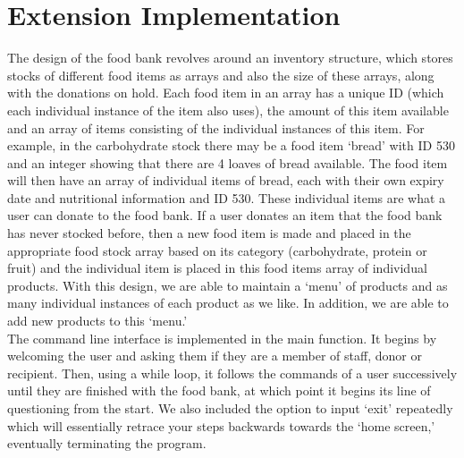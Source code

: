 \documentclass [10pt] {article}
\begin{document}
\section*{Extension Implementation}
The design of the food bank revolves around an inventory structure, which stores stocks of different food items as arrays and also the size of these arrays, along with the donations on hold. Each food item in an array has a unique ID (which each individual instance of the item also uses), the amount of this item available and an array of items consisting of the individual instances of this item. For example, in the carbohydrate stock there may be a food item ‘bread’ with ID 530 and an integer showing that there are 4 loaves of bread available. The food item will then have an array of individual items of bread, each with their own expiry date and nutritional information and ID 530. These individual items are what a user can donate to the food bank. If a user donates an item that the food bank has never stocked before, then a new food item is made and placed in the appropriate food stock array based on its category (carbohydrate, protein or fruit) and the individual item is placed in this food items array of individual products. With this design, we are able to maintain a ‘menu’ of products and as many individual instances of each product as we like. In addition, we are able to add new products to this ‘menu.’ 
\vspace {0.3cm}
\\
The command line interface is implemented in the main function. It begins by welcoming the user and asking them if they are a member of staff, donor or recipient. Then, using a while loop, it follows the commands of a user successively until they are finished with the food bank, at which point it begins its line of questioning from the start. We also included the option to input ‘exit’ repeatedly which will essentially retrace your steps backwards towards the ‘home screen,’ eventually terminating the program. 
\vspace {0.3cm}
\\
\end{document}
